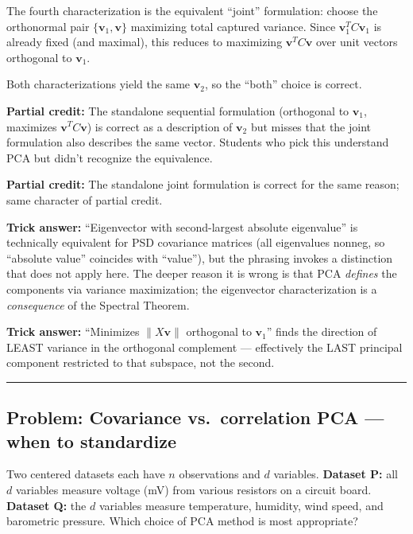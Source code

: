 \documentclass[12pt]{amsart}
\newcommand{\divider}{
  \vspace{-1em}
  \noindent
  \raisebox{-0.15ex}{\textbullet}%
  \hspace{0.5em}%
  \rule[0.5ex]{0.95\textwidth}{1.0pt}%
  \hspace{0.5em}%
  \raisebox{-0.15ex}{\textbullet}%
  \vspace{0em}
}
\begin{document}
The fourth characterization is the equivalent ``joint'' formulation:
choose the orthonormal pair $\{\mathbf{v}_1, \mathbf{v}\}$ maximizing total
captured variance. Since $\mathbf{v}_1^T C \mathbf{v}_1$ is already fixed
(and maximal), this reduces to maximizing $\mathbf{v}^T C \mathbf{v}$ over
unit vectors orthogonal to $\mathbf{v}_1$.

Both characterizations yield the same $\mathbf{v}_2$, so the ``both''
choice is correct.

\textbf{Partial credit:}
The standalone sequential formulation (orthogonal to $\mathbf{v}_1$, maximizes
$\mathbf{v}^TC\mathbf{v}$) is correct as a description of $\mathbf{v}_2$
but misses that the joint formulation also describes the same vector.
Students who pick this understand PCA but didn't recognize the equivalence.

\textbf{Partial credit:}
The standalone joint formulation is correct for the same reason; same
character of partial credit.

\textbf{Trick answer:}
``Eigenvector with second-largest absolute eigenvalue'' is technically
equivalent for PSD covariance matrices (all eigenvalues nonneg, so
``absolute value'' coincides with ``value''), but the phrasing invokes a
distinction that does not apply here. The deeper reason it is wrong is
that PCA \emph{defines} the components via variance maximization;
the eigenvector characterization is a \emph{consequence} of the Spectral Theorem.

\textbf{Trick answer:}
``Minimizes $\|X\mathbf{v}\|$ orthogonal to $\mathbf{v}_1$'' finds the
direction of LEAST variance in the orthogonal complement --- effectively
the LAST principal component restricted to that subspace, not the second.

\divider

\subsection*{Problem: Covariance vs.\ correlation PCA --- when to standardize}

Two centered datasets each have $n$ observations and $d$ variables.
\textbf{Dataset P:} all $d$ variables measure voltage (mV) from various
resistors on a circuit board.
\textbf{Dataset Q:} the $d$ variables measure temperature, humidity,
wind speed, and barometric pressure.
Which choice of PCA method is most appropriate?
\end{document}
